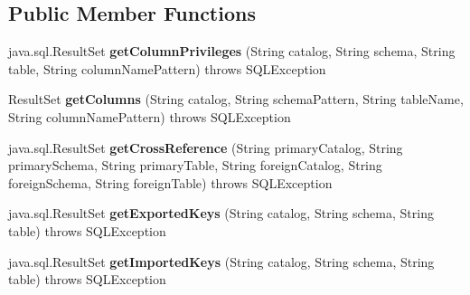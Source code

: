 \subsection*{Public Member Functions}
\begin{DoxyCompactItemize}
\item 
\mbox{\label{classcom_1_1mysql_1_1cj_1_1jdbc_1_1_database_meta_data_using_info_schema_a2701efc264507afb24a891f51d8497c7}} 
java.\+sql.\+Result\+Set {\bfseries get\+Column\+Privileges} (String catalog, String schema, String table, String column\+Name\+Pattern)  throws S\+Q\+L\+Exception 
\item 
\mbox{\label{classcom_1_1mysql_1_1cj_1_1jdbc_1_1_database_meta_data_using_info_schema_a76ac6f1cc59fc5cc7198bd206d70b06e}} 
Result\+Set {\bfseries get\+Columns} (String catalog, String schema\+Pattern, String table\+Name, String column\+Name\+Pattern)  throws S\+Q\+L\+Exception 
\item 
\mbox{\label{classcom_1_1mysql_1_1cj_1_1jdbc_1_1_database_meta_data_using_info_schema_a78af57a69e485d80693e631caab23b0a}} 
java.\+sql.\+Result\+Set {\bfseries get\+Cross\+Reference} (String primary\+Catalog, String primary\+Schema, String primary\+Table, String foreign\+Catalog, String foreign\+Schema, String foreign\+Table)  throws S\+Q\+L\+Exception 
\item 
\mbox{\label{classcom_1_1mysql_1_1cj_1_1jdbc_1_1_database_meta_data_using_info_schema_a6e40c5eff2034138c5b6d97c8f15a5f9}} 
java.\+sql.\+Result\+Set {\bfseries get\+Exported\+Keys} (String catalog, String schema, String table)  throws S\+Q\+L\+Exception 
\item 
\mbox{\label{classcom_1_1mysql_1_1cj_1_1jdbc_1_1_database_meta_data_using_info_schema_a2d06b32656148d141c496e50baf86d1c}} 
java.\+sql.\+Result\+Set {\bfseries get\+Imported\+Keys} (String catalog, String schema, String table)  throws S\+Q\+L\+Exception 
\item 
\mbox{\label{classcom_1_1mysql_1_1cj_1_1jdbc_1_1_database_meta_data_using_info_schema_ad48b81b8bb1e376e146d816307ece3cc}} 

\end{DoxyCompactItemize}

